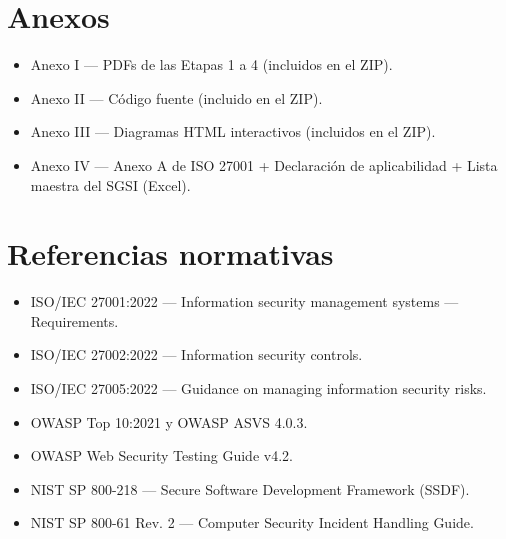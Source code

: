 \documentclass[12pt,a4paper,oneside]{article}
\begin{document}
\section*{Anexos}
\begin{itemize}[leftmargin=*]
  \item Anexo I — PDFs de las Etapas 1 a 4 (incluidos en el ZIP).
  \item Anexo II — Código fuente (incluido en el ZIP).
  \item Anexo III — Diagramas HTML interactivos (incluidos en el ZIP).
  \item Anexo IV — Anexo A de ISO 27001 + Declaración de aplicabilidad + Lista maestra del SGSI (Excel).
\end{itemize}

\section*{Referencias normativas}
\begin{itemize}[leftmargin=*]
  \item ISO/IEC 27001:2022 — Information security management systems — Requirements.
  \item ISO/IEC 27002:2022 — Information security controls.
  \item ISO/IEC 27005:2022 — Guidance on managing information security risks.
  \item OWASP Top 10:2021 y OWASP ASVS 4.0.3.
  \item OWASP Web Security Testing Guide v4.2.
  \item NIST SP 800-218 — Secure Software Development Framework (SSDF).
  \item NIST SP 800-61 Rev. 2 — Computer Security Incident Handling Guide.
\end{itemize}
\end{document}
